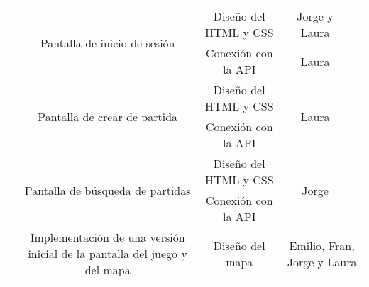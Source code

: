 \documentclass[11pt, a4paper, titlepage]{article}
\begin{document}
\begin{landscape}
\begin{table}[hbt!]
\begin{tabular}{c|ccll|cc|}
\multicolumn{1}{|c|}{}                            & \multicolumn{1}{c|}{\multirow{2}{*}{Pantalla de inicio de sesión}}                                              & \multicolumn{3}{c|}{Diseño del HTML y CSS}                                                                     & \multicolumn{1}{c|}{Jorge y Laura}          &                                \\ \cline{3-6}
\multicolumn{1}{|c|}{}                            & \multicolumn{1}{c|}{}                                                                                           & \multicolumn{3}{c|}{Conexión con la API}                                                                       & \multicolumn{1}{c|}{Laura}                  &                                \\ \cline{2-6}
\multicolumn{1}{|c|}{}                            & \multicolumn{1}{c|}{\multirow{2}{*}{Pantalla de crear de partida}}                                              & \multicolumn{3}{c|}{Diseño del HTML y CSS}                                                                     & \multicolumn{1}{c|}{\multirow{2}{*}{Laura}} &                                \\ \cline{3-5}
\multicolumn{1}{|c|}{}                            & \multicolumn{1}{c|}{}                                                                                           & \multicolumn{3}{c|}{Conexión con la API}                                                                       & \multicolumn{1}{c|}{}                       &                                \\ \cline{2-6}
\multicolumn{1}{|c|}{}                            & \multicolumn{1}{c|}{\multirow{2}{*}{Pantalla de búsqueda de partidas}}                                          & \multicolumn{3}{c|}{Diseño del HTML y CSS}                                                                     & \multicolumn{1}{c|}{\multirow{2}{*}{Jorge}} &                                \\ \cline{3-5}
\multicolumn{1}{|c|}{}                            & \multicolumn{1}{c|}{}                                                                                           & \multicolumn{3}{c|}{Conexión con la API}                                                                       & \multicolumn{1}{c|}{}                       &                                \\ \cline{2-7}
\multicolumn{1}{|c|}{}                            & \multicolumn{1}{c|}{\multirow{5}{*}{Implementación de una versión inicial de la pantalla del juego y del mapa}} & \multicolumn{3}{c|}{Diseño del mapa}                                                                           & \multicolumn{2}{c|}{Emilio, Fran, Jorge y Laura}                             \\ \cline{3-7}

\end{tabular}
\end{table}
\end{landscape}
\end{document}
